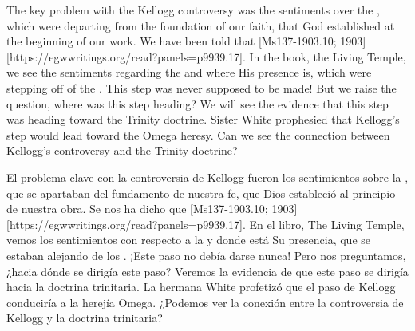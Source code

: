 



The key problem with the Kellogg controversy was the sentiments over the , which were departing from the foundation of our faith, that God established at the beginning of our work. We have been told that [Ms137-1903.10; 1903][https://egwwritings.org/read?panels=p9939.17]. In the book, the Living Temple, we see the sentiments regarding the  and where His presence is, which were stepping off of the . This step was never supposed to be made! But we raise the question, where was this step heading? We will see the evidence that this step was heading toward the Trinity doctrine. Sister White prophesied that Kellogg’s step would lead toward the Omega heresy. Can we see the connection between Kellogg’s controversy and the Trinity doctrine?


El problema clave con la controversia de Kellogg fueron los sentimientos sobre la , que se apartaban del fundamento de nuestra fe, que Dios estableció al principio de nuestra obra. Se nos ha dicho que [Ms137-1903.10; 1903][https://egwwritings.org/read?panels=p9939.17]. En el libro, The Living Temple, vemos los sentimientos con respecto a la  y donde está Su presencia, que se estaban alejando de los . ¡Este paso no debía darse nunca! Pero nos preguntamos, ¿hacia dónde se dirigía este paso? Veremos la evidencia de que este paso se dirigía hacia la doctrina trinitaria. La hermana White profetizó que el paso de Kellogg conduciría a la herejía Omega. ¿Podemos ver la conexión entre la controversia de Kellogg y la doctrina trinitaria?


